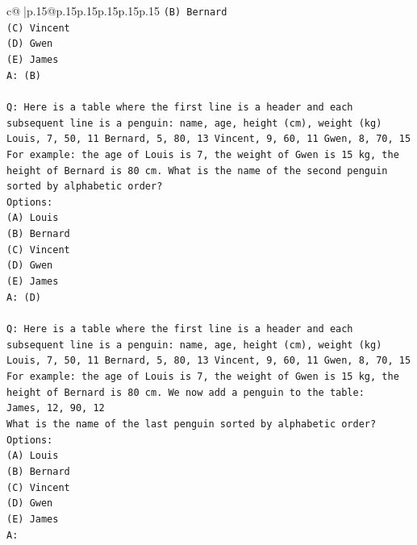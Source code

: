 \documentclass{article}
\begin{document}
{\begin{supertabular}{c@{$\;$}|p{.15\linewidth}@{}p{.15\linewidth}p{.15\linewidth}p{.15\linewidth}p{.15\linewidth}p{.15\linewidth}}
{{{\texttt{(B) Bernard} \\
\texttt{(C) Vincent} \\
\texttt{(D) Gwen} \\
\texttt{(E) James} \\
\texttt{A: (B)} \\
\\ 
\texttt{Q: Here is a table where the first line is a header and each subsequent line is a penguin:  name, age, height (cm), weight (kg) Louis, 7, 50, 11 Bernard, 5, 80, 13 Vincent, 9, 60, 11 Gwen, 8, 70, 15  For example: the age of Louis is 7, the weight of Gwen is 15 kg, the height of Bernard is 80 cm.  What is the name of the second penguin sorted by alphabetic order?} \\
\texttt{Options:} \\
\texttt{(A) Louis} \\
\texttt{(B) Bernard} \\
\texttt{(C) Vincent} \\
\texttt{(D) Gwen} \\
\texttt{(E) James} \\
\texttt{A: (D)} \\
\\ 
\texttt{Q: Here is a table where the first line is a header and each subsequent line is a penguin:  name, age, height (cm), weight (kg) Louis, 7, 50, 11 Bernard, 5, 80, 13 Vincent, 9, 60, 11 Gwen, 8, 70, 15  For example: the age of Louis is 7, the weight of Gwen is 15 kg, the height of Bernard is 80 cm.  We now add a penguin to the table:} \\
\texttt{James, 12, 90, 12} \\
\texttt{What is the name of the last penguin sorted by alphabetic order?} \\
\texttt{Options:} \\
\texttt{(A) Louis} \\
\texttt{(B) Bernard} \\
\texttt{(C) Vincent} \\
\texttt{(D) Gwen} \\
\texttt{(E) James} \\
\texttt{A:} \\
            }
        }
    }
     \\ \\


\end{supertabular}}
\end{document}
